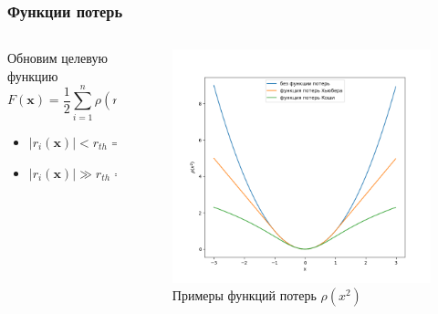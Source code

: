 \documentclass[notheorems,aspectratio=169]{beamer}
\begin{document}
\begin{frame}
  \frametitle{Функции потерь}
  \begin{columns}[c]
    \begin{column}{0.5\textwidth}
      Обновим целевую функцию
      $$F\left(\mathbf{x}\right)=\frac{1}{2}\sum_{i=1}^n\rho\left(r_i^2\left(\mathbf{x}\right)\right)$$
      \begin{itemize}
        \item $\left|r_i\left(\mathbf{x}\right)\right|<r_{th} \implies \rho\left(r_i\left(\mathbf{x}\right)\right)\approx r_i^2\left(\mathbf{x}\right)$
        \item $\left|r_i\left(\mathbf{x}\right)\right|\gg r_{th} \implies \rho\left(r_i\left(\mathbf{x}\right)\right)\ll r_i^2\left(\mathbf{x}\right)$
      \end{itemize}
    \end{column}

    \begin{column}{0.5\textwidth}
      \begin{figure}
        \includegraphics[height=0.7\textheight, keepaspectratio]{loss.png}
        \vspace{-0.5cm}
        \caption*{Примеры функций потерь $\rho\left(x^2\right)$}
      \end{figure}
    \end{column}
  \end{columns}
\end{frame}
\end{document}
